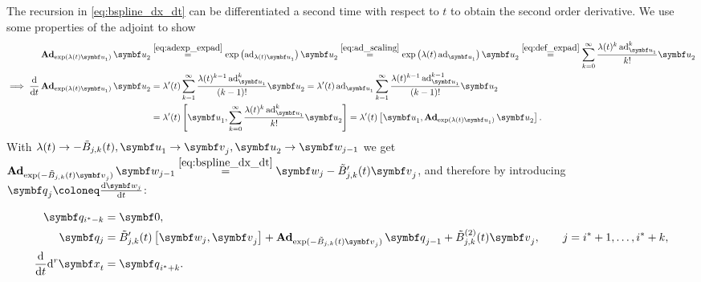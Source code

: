 The recursion in \eqref{eq:bspline_dx_dt} can be differentiated a second time with respect to $t$ to obtain the second order derivative. We use some properties of the adjoint to show
\begin{equation}
  \begin{aligned}
    \bAd_{\exp(\lambda(t) \bu_1)} \bu_2
     & \overset{\eqref{eq:adexp_expad}}= \exp \left( \ad_{\lambda(t) \bu_1} \right) \bu_2 \overset{\eqref{eq:ad_scaling}}= \exp \left( \lambda(t) \ad_{\bu_1} \right) \bu_2 \overset{\eqref{eq:def_expad}}= \sum_{k=0}^\infty \frac{\lambda(t)^k \ad_{\bu_1}^k  }{k!} \bu_2 \\
    \implies \frac{\mathrm{d}}{\mathrm{d}t} \bAd_{\exp(\lambda(t) \bu_1)} \bu_2
     & = \lambda'(t) \sum_{k=1}^\infty \frac{\lambda(t)^{k-1} \ad_{\bu_1}^k }{(k-1)!} \bu_2 = \lambda'(t) \ad_{\bu_1} \sum_{k=1}^\infty \frac{\lambda(t)^{k-1} \ad_{\bu_1}^{k-1} }{(k-1)!}\bu_2                                                                               \\
     & = \lambda'(t) \left[ \bu_1, \sum_{k=0}^\infty \frac{\lambda(t)^k \ad_{\bu_1}^k}{k!} \bu_2 \right]                                                                                   =  \lambda'(t) \left[ \bu_1, \bAd_{\exp(\lambda(t) \bu_1)} \bu_2 \right].
  \end{aligned}
\end{equation}
With $\lambda(t) \rightarrow - \tilde B_{j, k}(t), \bu_1 \rightarrow \bv_j, \bu_2 \rightarrow \symbf w_{j-1}$ we get $\bAd_{\exp(-\tilde B_{j, k}(t) \bv_j)} \symbf w_{j-1} \overset{\eqref{eq:bspline_dx_dt}}= \symbf w_j - \tilde B_{j, k}'(t) \bv_j$, and therefore by introducing $\bq_j \coloneq \frac{\mathrm{d} \symbf w_j}{\mathrm{d} t}$:
\begin{important}
  \begin{equation}
    \begin{aligned}
      \symbf q_{i^* - k} & = \symbf 0,                                                                                                                                                                        \\
      \symbf q_j     & = \tilde B_{j, k}'(t) \left[ \symbf w_j, \bv_j \right]  + \bAd_{\exp(-\tilde B_{j, k}(t) \bv_j )} \bq_{j-1} + \tilde B^{(2)}_{j, k}(t) \bv_j, \qquad j = i^* + 1, \ldots, i^* + k, \\
      \frac{\mathrm{d}}{\mathrm{d}t} \mathrm{d}^r \x_t
                     & = \bq_{i^* + k}.
    \end{aligned}
  \end{equation}
\end{important}

